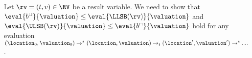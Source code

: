 Let $\rv = (t,v) \in \RV$ be a result variable.
We need to show that $\eval{b^\sqcup}{\valuation} \leq \eval{\LLSB(\rv)}{\valuation}$ and $\eval{\ULSB(\rv)}{\valuation} \leq \eval{b^\sqcap}{\valuation}$ hold for any evaluation $(\location_0, \valuation_0) \rightarrow^* (\location, \valuation) \rightarrow_t (\location', \valuation') \rightarrow^* \dots$.
